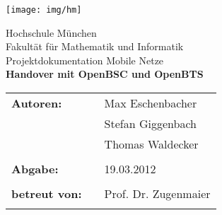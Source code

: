 %
\begin{titlepage}
\begin{flushright}
\texttt{[image: img/hm]}%
\end{flushright}

\vspace*{20mm}
\begin{center}
{\Large Hochschule München}\\
{\large Fakultät für Mathematik und Informatik}\\

\vspace*{15mm}
{\huge Projektdokumentation Mobile Netze}\\

\vspace*{10mm}
{\huge \bfseries{Handover mit OpenBSC und OpenBTS}} \\
\vspace*{15mm} 
\end{center}

\vspace*{30mm}

\begin{tabular}{lll}
\textbf{\large {Autoren:}} & & \large {Max Eschenbacher}\\
			   & & \large {Stefan Giggenbach}\\
			   & & \large {Thomas Waldecker}\\
& & \\

\textbf{\large {Abgabe:}} & & \large {19.03.2012}\\
& & \\

\textbf{\large {betreut von:}} & & \large {Prof. Dr. Zugenmaier}\\
& & \\
\end{tabular}

\end{titlepage}

\tableofcontents
\newpage
